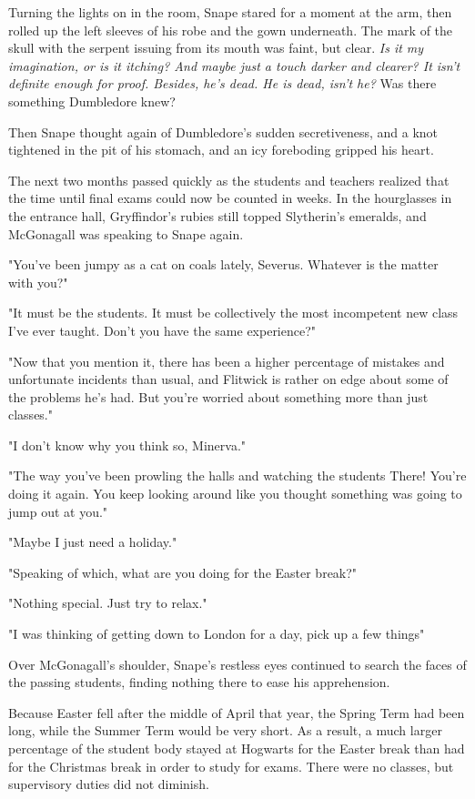 Turning the lights on in the room, Snape stared for a moment at the arm, then rolled up the left sleeves of his robe and the gown underneath. The mark of the skull with the serpent issuing from its mouth was faint, but clear. \emph{Is it my imagination, or is it itching? And maybe just a touch darker and clearer? It isn't definite enough for proof. Besides, he's dead. He is dead, isn't he?} Was there something Dumbledore knew?

Then Snape thought again of Dumbledore's sudden secretiveness, and a knot tightened in the pit of his stomach, and an icy foreboding gripped his heart.

\sbreak

The next two months passed quickly as the students and teachers realized that the time until final exams could now be counted in weeks. In the hourglasses in the entrance hall, Gryffindor's rubies still topped Slytherin's emeralds, and McGonagall was speaking to Snape again.

"You've been jumpy as a cat on coals lately, Severus. Whatever is the matter with you?"

"It must be the students. It must be collectively the most incompetent new class I've ever taught. Don't you have the same experience?"

"Now that you mention it, there has been a higher percentage of mistakes and unfortunate incidents than usual, and Flitwick is rather on edge about some of the problems he's had. But you're worried about something more than just classes."

"I don't know why you think so, Minerva."

"The way you've been prowling the halls and watching the students{\el} There! You're doing it again. You keep looking around like you thought something was going to jump out at you."

"Maybe I just need a holiday."

"Speaking of which, what are you doing for the Easter break?"

"Nothing special. Just try to relax."

"I was thinking of getting down to London for a day, pick up a few things{\el}"

Over McGonagall's shoulder, Snape's restless eyes continued to search the faces of the passing students, finding nothing there to ease his apprehension.

\sbreak

Because Easter fell after the middle of April that year, the Spring Term had been long, while the Summer Term would be very short. As a result, a much larger percentage of the student body stayed at Hogwarts for the Easter break than had for the Christmas break in order to study for exams. There were no classes, but supervisory duties did not diminish.

